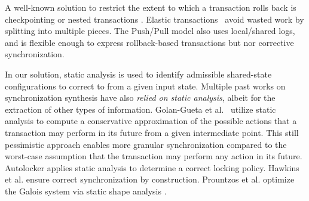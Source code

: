 %
A well-known solution to restrict the extent to which a transaction rolls back is checkpointing \cite{spaa08a,Egwutuoha:2013}
or nested transactions \cite{ont,beeri}.
Elastic transactions~\cite{FGG:DISC09} avoid wasted work by splitting into multiple pieces.  
%
The Push/Pull model \cite{KoskinenP15} also uses local/shared logs, and is flexible enough to express rollback-based transactions but nor corrective synchronization.

In our solution, static analysis is used to identify admissible shared-state configurations to correct to from a given input state. Multiple past works on synchronization synthesis have also \emph{relied on static analysis}, albeit for the extraction of other types of information. 
%
Golan-Gueta et al.~\cite{GRSY:PLDI13} utilize static analysis to compute a conservative approximation of the possible actions that a transaction may perform in its future from a given intermediate point. This still pessimistic approach enables more granular synchronization compared to the worst-case assumption that the transaction may perform any action in its future.
%
Autolocker \cite{popl/McCloskeyZGB06} applies static analysis to determine a correct locking policy.
%
Hawkins et al. \cite{HawkinsAFRS12}
ensure correct synchronization by construction.
%
Prountzos et al. \cite{PrountzosMPM11} optimize the Galois system \cite{Galois} via static shape analysis \cite{MoolyToplas}.





